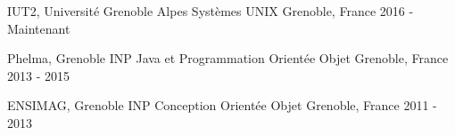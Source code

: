 

\begin{cventries}

  \cventry
    {IUT2, Université Grenoble Alpes} %
    {Systèmes UNIX} %
    {Grenoble, France} %
    {2016 - Maintenant} %
    {}

  \cventry
    {Phelma, Grenoble INP} %
    {Java et Programmation Orientée Objet} %
    {Grenoble, France} %
    {2013 - 2015} %
    {}

  \cventry
    {ENSIMAG, Grenoble INP} %
    {Conception Orientée Objet} %
    {Grenoble, France} %
    {2011 - 2013} %
    {}
    
\end{cventries}
